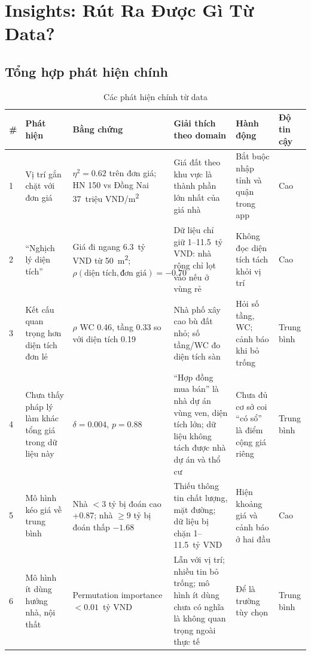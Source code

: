 \documentclass[11pt]{article}
\newcommand{\ty}{tỷ VND}
\newcommand{\trm}{triệu VND/m\textsuperscript{2}}
\newcommand{\mtwo}{m\textsuperscript{2}}
\begin{document}
\section{Insights: Rút Ra Được Gì Từ Data?}

\subsection{Tổng hợp phát hiện chính}

\begin{table}[H]
\centering
\footnotesize
\caption{Các phát hiện chính từ data}
\begin{tabular}{@{}L{0.03\textwidth}L{0.17\textwidth}L{0.20\textwidth}L{0.20\textwidth}L{0.17\textwidth}L{0.08\textwidth}@{}}
\toprule
\textbf{\#} & \textbf{Phát hiện} & \textbf{Bằng chứng} & \textbf{Giải thích theo domain} & \textbf{Hành động} & \textbf{Độ tin cậy} \\
 & Vị trí gắn chặt với đơn giá & $\eta^2 = 0.62$ trên đơn giá; HN 150 vs Đồng Nai 37~\trm & Giá đất theo khu vực là thành phần lớn nhất của giá nhà & Bắt buộc nhập tỉnh và quận trong app & Cao \\
2 & ``Nghịch lý diện tích'' & Giá đi ngang 6.3~\ty{} từ 50~\mtwo; $\rho(\text{diện tích}, \text{đơn giá}) = -0.70$ & Dữ liệu chỉ giữ 1--11.5~\ty: nhà rộng chỉ lọt vào nếu ở vùng rẻ & Không đọc diện tích tách khỏi vị trí & Cao \\
3 & Kết cấu quan trọng hơn diện tích đơn lẻ & $\rho$ WC 0.46, tầng 0.33 so với diện tích 0.19 & Nhà phố xây cao bù đất nhỏ; số tầng/WC đo diện tích sàn & Hỏi số tầng, WC; cảnh báo khi bỏ trống & Trung bình \\
4 & Chưa thấy pháp lý làm khác tổng giá trong dữ liệu này & $\delta = 0.004$, $p = 0.88$ & ``Hợp đồng mua bán'' là nhà dự án vùng ven, diện tích lớn; dữ liệu không tách được nhà dự án và thổ cư & Chưa đủ cơ sở coi ``có sổ'' là điểm cộng giá riêng & Trung bình \\
5 & Mô hình kéo giá về trung bình & Nhà $< 3$ tỷ bị đoán cao +0.87; nhà $\geq 9$ tỷ bị đoán thấp $-1.68$ & Thiếu thông tin chất lượng, mặt đường; dữ liệu bị chặn 1--11.5~\ty & Hiện khoảng giá và cảnh báo ở hai đầu & Cao \\
6 & Mô hình ít dùng hướng nhà, nội thất & Permutation importance $< 0.01$~\ty & Lẫn với vị trí; nhiều tin bỏ trống; mô hình ít dùng chưa có nghĩa là không quan trọng ngoài thực tế & Để là trường tùy chọn & Trung bình \\

\end{tabular}
\end{table}
\end{document}
